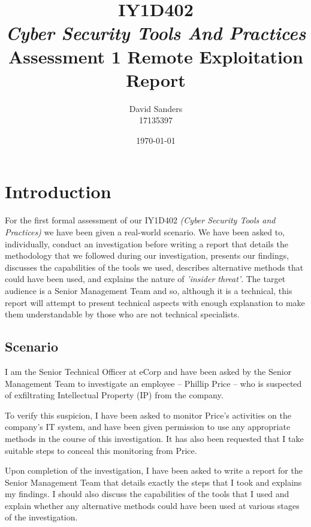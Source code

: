 \documentclass[12pt]{article}
\title{IY1D402\\{\textit{\small Cyber Security Tools And Practices}}\\Assessment 1 Remote Exploitation Report}
\author{David Sanders\\{\LARGE 17135397}}
\date{\today}
\begin{document}
\maketitle
\pagebreak
% 
\tableofcontents




\pagebreak
\section{Introduction}
For the first formal assessment of our IY1D402 \textit{(Cyber Security Tools and Practices)} we have been given a real-world scenario. We have been asked to, individually, conduct an investigation before writing a report that details the methodology that we followed during our investigation, presents our findings, discusses the capabilities of the tools we used, describes alternative methods that could have been used, and explains the nature of \textit{'insider threat'}. The target audience is a Senior Management Team and so, although it is a technical, this report will attempt to present technical aspects with enough explanation to make them understandable by those who are not technical specialists.

\subsection{Scenario}
I am the Senior Technical Officer at eCorp and have been asked by the Senior Management Team to investigate an employee -- Phillip Price -- who is suspected of exfiltrating Intellectual Property (IP) from the company.

To verify this suspicion, I have been asked to monitor Price's activities on the company's IT system, and have been given permission to use any appropriate methods in the course of this investigation. It has also been requested that I take suitable steps to conceal this monitoring from Price.

Upon completion of the investigation, I have been asked to write a report for the Senior Management Team that details exactly the steps that I took and explains my findings. I should also discuss the capabilities of the tools that I used and explain whether any alternative methods could have been used at various stages of the investigation.
\end{document}
